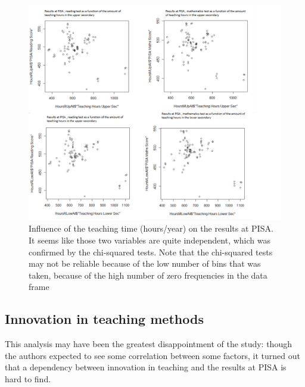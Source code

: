 \documentclass[12pt,a4paper]{article}
\begin{document}
\begin{figure}
	\centering
	\label{STRatio}
	\caption{Influence of the teaching time (hours/year) on the results at PISA. It seems like those two variables are quite independent, which was confirmed by the chi-squared tests. Note that the chi-squared tests may not be reliable because of the low number of bins that was taken, because of the high number of zero frequencies in the data frame}
	\includegraphics[scale=0.4]{img/TeachingHours.png}
\end{figure}

\subsection{Innovation in teaching methods}

This analysis may have been the greatest disappointment of the study: though the authors expected to see some correlation between some factors, it turned out that a dependency between innovation in teaching and the results at PISA is hard to find.
\end{document}
